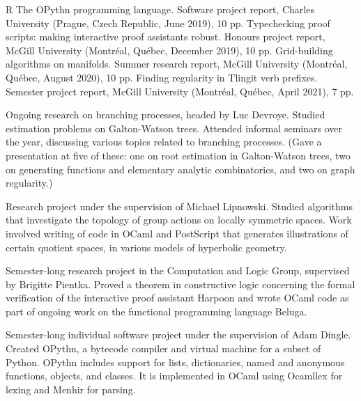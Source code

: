 \goodbreak
{}

\pubbegin R
\repitem The OPythn programming language. Software project report, Charles University (Prague,
Czech Republic, June 2019), 10 pp.
\repitem Typechecking proof scripts: making interactive proof assistants robust.
Honours project report, McGill University (Montr\'eal, Qu\'ebec, December 2019), 10 pp.
\repitem Grid-building algorithms on manifolds. Summer research report, McGill University (Montr\'eal, Qu\'ebec,
August 2020), 10 pp.
\repitem Finding regularity in Tlingit verb prefixes. Semester project report, McGill University
(Montr\'eal, Qu\'ebec, April 2021), 7 pp.


\smallskip
Ongoing research on branching processes, headed by Luc Devroye. Studied estimation problems
on Galton-Watson trees. Attended informal seminars over the year, discussing
various topics related to branching
processes. (Gave a presentation at five of these: one on root estimation in Galton-Watson
trees, two on generating functions and elementary analytic combinatorics, and two on graph regularity.)

\medbreak
{}
\smallskip
Research project under the supervision of Michael Lipnowski.
Studied algorithms that investigate the topology of group actions on locally symmetric spaces.
Work involved writing of code in OCaml and PostScript that generates illustrations of certain quotient
spaces, in various models of hyperbolic geometry.
\medbreak

\smallskip
Semester-long research project in the Computation and Logic Group, supervised
by Brigitte Pientka.
Proved a theorem in constructive logic concerning the formal verification
of the interactive proof assistant Harpoon and wrote OCaml code as part of
ongoing work on the functional programming language Beluga.
\medbreak

\smallskip
Semester-long individual software project under the supervision of Adam Dingle.
Created OPythn, a bytecode compiler and virtual machine for a subset of Python.
OPythn includes support for lists, dictionaries, named and anonymous functions, objects, and classes.
It is implemented in OCaml using Ocamllex for lexing and Menhir for parsing.

